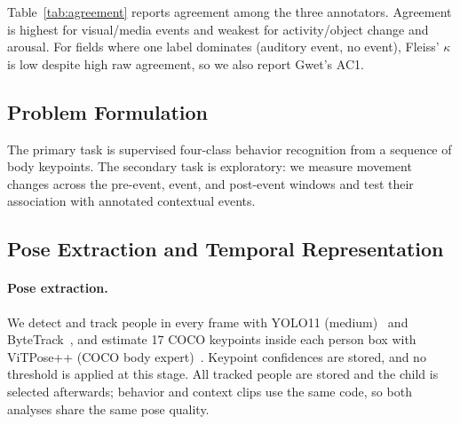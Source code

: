 \documentclass[10pt,twocolumn,letterpaper]{article}
\begin{document}

Table~\ref{tab:agreement} reports agreement among the three annotators. Agreement is highest for visual/media events and weakest for activity/object change and arousal. For fields where one label dominates (auditory event, no event), Fleiss' $\kappa$ is low despite high raw agreement, so we also report Gwet's AC1.




\subsection{Problem Formulation}
\label{subsec:problem_formulation}
The primary task is supervised four-class behavior recognition from a sequence of body keypoints. The secondary task is exploratory: we measure movement changes across the pre-event, event, and post-event windows and test their association with annotated contextual events. 

\subsection{Pose Extraction and Temporal Representation}
\label{subsec:pose_extraction}

\paragraph{Pose extraction.}
We detect and track people in every frame with YOLO11 (medium)~\cite{jocher2024yolo11, Redmon_2016_CVPR} and ByteTrack~\cite{zhang2022bytetrack}, and estimate 17 COCO keypoints inside each person box with ViTPose++ (COCO body expert)~\cite{xu2022vitpose,xu2023vitpose++}. Keypoint confidences are stored, and no threshold is applied at this stage. All tracked people are stored and the child is selected afterwards; behavior and context clips use the same code, so both analyses share the same pose quality.
\end{document}
